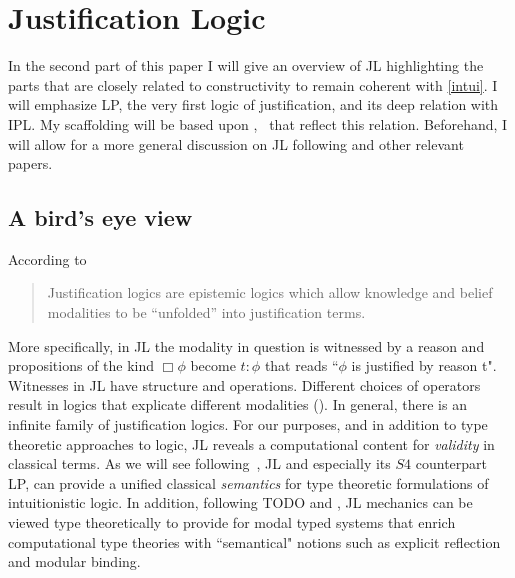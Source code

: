 \chapter{Justification Logic}
In the second part of this paper I will give an overview of \ac {JL} highlighting the parts that are closely related to constructivity to remain coherent with \ref{intui}. I will emphasize LP, the very first logic of justification, and its deep relation with \ac{IPL}. My scaffolding will be based upon \cite{Art01BSL},~\cite{Art95TR}  that reflect this relation. Beforehand, I will allow for a more general discussion on \ac{JL} following \cite{sep-logic-justification} and other relevant papers.


\section{A bird's eye view}
According to \cite{sep-logic-justification}\begin{quotation} Justification logics are epistemic logics which allow knowledge and belief modalities to be ``unfolded'' into justification terms.
\end{quotation}
 More specifically, in \ac{JL} the modality in question is witnessed by a reason and propositions of the kind $\Box\phi$ become $t:\phi$ that reads ``$\phi$ is justified by reason t". Witnesses in \ac{JL} have structure and operations. Different choices of operators result in logics that explicate different modalities ({}). 
 In general, there is an infinite family of justification logics.
 For our purposes, and in addition to type theoretic approaches to logic, \ac{JL} reveals a computational content for \emph{validity} in classical terms. As we will see following~\cite{artemov97un}, \ac{JL} and especially its {\sf $S4$} counterpart \ac{LP}, can provide a unified classical \emph{semantics} for type theoretic formulations of intuitionistic logic. In addition, following TODO and \cite{DBLP:journals/entcs/PouliasisP14}, \ac{JL} mechanics can be viewed type theoretically to provide for modal typed systems that enrich computational type theories with ``semantical" notions such as explicit reflection and modular binding. 
 

